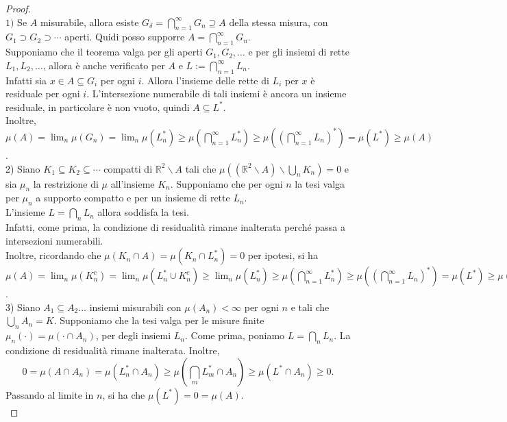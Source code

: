 \documentclass[a4paper, twoside,openright]{article}
\newcommand{\<}{\langle}
\renewcommand{\>}{\rangle}
\begin{document}
\begin{proof} \hfill \\
	$1)$ Se $A$ misurabile, allora esiste $G_{\delta} = \bigcap_{n=1}^{\infty} G_{n} \supseteq A$ della stessa misura, con $G_{1} \supset G_{2} \supset \cdots$ aperti. Quidi posso supporre $A=\bigcap_{n=1}^{\infty} G_{n}$.\\
	Supponiamo che il teorema valga per gli aperti $G_{1}, G_{2}, \ldots$ e per gli insiemi di rette $L_{1}, L_{2}, \ldots$, allora è anche verificato per  $A$ e $L:=\bigcap_{n=1}^{\infty} L_{n}$.\\
	Infatti sia $x \in A \subseteq G_i$ per ogni $i$. Allora l'insieme delle rette di $L_i$ per $x$ è residuale per ogni $i$. L'intersezione numerabile di tali insiemi è ancora un insieme residuale, in particolare è non vuoto, quindi $A \subseteq L^*$.\\
	Inoltre, $\mu(A) = \lim_n \mu(G_n) = \lim_n \mu(L_n^*) \geq \mu\left(\bigcap_{n=1}^\infty L_n^*\right) \geq \mu\left(\left(\bigcap_{n=1}^\infty L_n\right)^*\right) = \mu(L^*) \geq \mu(A)$. \\

	2) Siano $K_{1} \subseteq K_{2} \subseteq \cdots$ compatti di $\mathbb{R}^{2} \backslash A$ tali che $\mu\left(\left(\mathbb{R}^{2} \backslash A\right) \backslash \bigcup_{n} K_{n}\right)=0$ e sia $\mu_{n}$ la restrizione di $\mu$ all'insieme $K_{n}$. Supponiamo che per ogni $n$ la tesi valga per $\mu_n$ a supporto compatto e per un insieme di rette $L_n$.\\
	L'insieme $L=\bigcap_n L_n$ allora soddisfa la tesi.\\
	Infatti, come prima, la condizione di residualità rimane inalterata perché passa a intersezioni numerabili.\\
	Inoltre, ricordando che $\mu(K_n \cap A)=\mu(K_n \cap L_n^*)=0$ per ipotesi, si ha 
	$\mu(A)=\lim_n\mu(K_n^c)=\lim_n\mu(L_n^* \cup K_n^c) \geq \lim_n \mu(L_n^*) \geq \mu\left(\bigcap_{n=1}^\infty L_n^*\right) \geq \mu\left(\left(\bigcap_{n=1}^\infty L_n\right)^*\right) = \mu(L^*) \geq \mu(A)$.\\

	3) Siano $A_1 \subseteq A_2 ...$ insiemi misurabili con $\mu(A_n) < \infty$ per ogni $n$ e tali che $\bigcup_n A_n=K$. Supponiamo che la tesi valga per le misure finite $\mu_n(\cdot)=\mu( \cdot \cap A_n)$, per degli insiemi $L_n$. Come prima, poniamo $L=\bigcap_n L_n$. La condizione di residualità rimane inalterata. Inoltre,
	$$0= \mu(A \cap A_n)=\mu(L_n^* \cap A_n)\geq\mu(\textstyle\bigcap_mL_m^* \cap A_n) \geq \mu(L^* \cap A_n) \geq 0.$$
	Passando al limite in $n$, si ha che $\mu(L^*)=0=\mu(A)$.\\


\end{proof}
\end{document}
